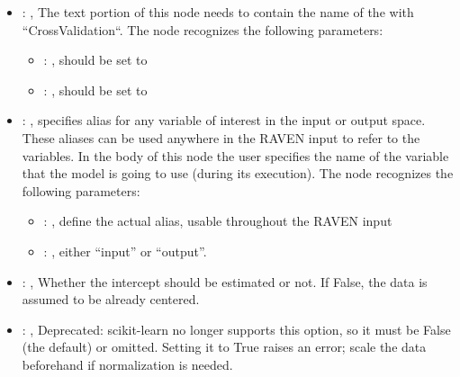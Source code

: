 \begin{itemize}
\begin{itemize}
        \item {}: ,
          List of IDs of features/variables to include in the transformation process.

        \item {}: ,
          Which space to search? Target or Feature?
      \end{itemize}

    \item {}: ,
      The text portion of this node needs to contain the name of the  with
               ``CrossValidation``.
      The  node recognizes the following parameters:
        \begin{itemize}
          \item {}: ,
            should be set to 
          \item {}: ,
            should be set to 
      \end{itemize}

    \item {}: ,
      specifies alias for         any variable of interest in the input or output space. These
      aliases can be used anywhere in the RAVEN input to         refer to the variables. In the body
      of this node the user specifies the name of the variable that the model is going to use
      (during its execution).
      The  node recognizes the following parameters:
        \begin{itemize}
          \item {}: ,
            define the actual alias, usable throughout the RAVEN input
          \item {}: ,
            either ``input'' or ``output''.
      \end{itemize}

    \item {}: ,
      Whether the intercept should be estimated or not. If False,
      the data is assumed to be already centered.

    \item {}: ,
      Deprecated: scikit-learn no longer supports this option, so it must be False (the default) or
      omitted.                                                  Setting it to True raises an error;
      scale the data beforehand if normalization is needed.
  \end{itemize}


